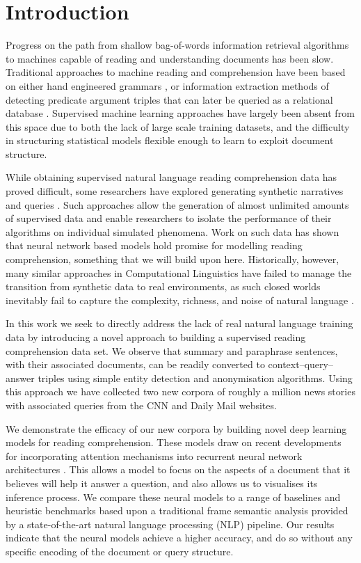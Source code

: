 \section{Introduction}
\label{introduction}

Progress on the path from shallow bag-of-words information retrieval
algorithms to machines capable of reading and understanding documents has been
slow. Traditional approaches to machine reading and comprehension have been
based on either hand engineered grammars \cite{Riloff:2000:RQA}, or information
extraction methods of detecting predicate argument triples that can later be
queried as a relational database \cite{Poon:2010:MRU}.
Supervised machine learning approaches have largely been absent from this space
due to both the lack of large scale training datasets, and the difficulty in
structuring statistical models flexible enough to learn to exploit document
structure.

While obtaining supervised natural language reading comprehension data has
proved difficult, some researchers have explored generating synthetic narratives
and queries \cite{Weston:2014:MN,Sukhbaatar:2015}. Such approaches allow
the generation of almost unlimited amounts of supervised data and enable
researchers to isolate the performance of their algorithms on individual
simulated phenomena. Work on such data has shown that neural network based
models hold promise for modelling reading comprehension, something that we
will build upon here.  Historically, however, many similar approaches in
Computational Linguistics have failed to manage the transition from synthetic
data to real environments, as such closed worlds inevitably fail to
capture the complexity, richness, and noise of natural language
\cite{Winograd:1972:UNL}.

In this work we seek to directly address the lack of real natural language
training data by introducing a novel approach to building a supervised reading
comprehension data set. We observe that summary and paraphrase sentences, with
their associated documents, can be readily converted to context--query--answer
triples using simple entity detection and anonymisation algorithms.
Using this approach we have collected two new corpora of roughly a million news
stories with associated queries from the CNN and Daily Mail websites.

We demonstrate the efficacy of our new corpora by building novel deep learning
models for reading comprehension. These models draw on recent developments
for incorporating attention mechanisms into recurrent neural network architectures
\cite{Bahdanau:2014:NMT,Mnih:2014:RMVA,Gregor:2015:DRAW,Sukhbaatar:2015}. This allows a model to
focus on the aspects of a document that it believes will help it answer a
question, and also allows us to visualises its inference process.
We compare these neural models to a range of baselines and heuristic benchmarks
based upon a traditional frame semantic analysis provided by a state-of-the-art
natural language processing (NLP) pipeline. Our results indicate that the neural
models achieve a higher accuracy, and do so without any specific encoding of the
document or query structure.
